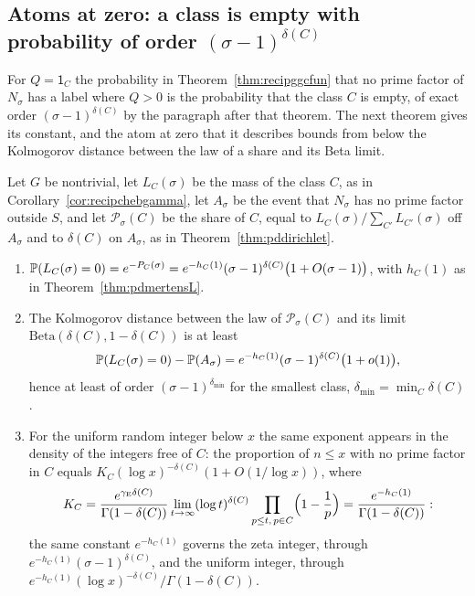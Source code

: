 \subsection{Atoms at zero: a class is empty with probability of order \texorpdfstring{$(\sigma-1)^{\delta(C)}$}{(sigma-1) to the delta(C)}}

For $Q=\mathsf1_C$ the probability in Theorem~\ref{thm:recipggcfun} that no prime factor of $N_\sigma$ has a label where $Q>0$ is the probability that the class $C$ is empty, of exact order $(\sigma-1)^{\delta(C)}$ by the paragraph after that theorem. The next theorem gives its constant, and the atom at zero that it describes bounds from below the Kolmogorov distance between the law of a share and its Beta limit.

\begin{theorem}\label{thm:pdrate}
Let $G$ be nontrivial, let $L_C(\sigma)$ be the mass of the class $C$, as in Corollary~\ref{cor:recipchebgamma}, let $A_\sigma$ be the event that $N_\sigma$ has no prime factor outside $S$, and let $\mathcal P_\sigma(C)$ be the share of $C$, equal to $L_C(\sigma)/\sum_{C'}L_{C'}(\sigma)$ off $A_\sigma$ and to $\delta(C)$ on $A_\sigma$, as in Theorem~\ref{thm:pddirichlet}.
\begin{enumerate}
\item[(i)] $\mathbb{P}(L_C(\sigma)=0)=e^{-P_C(\sigma)}=e^{-h_C(1)}(\sigma-1)^{\delta(C)}\bigl(1+O(\sigma-1)\bigr)$, with $h_C(1)$ as in Theorem~\ref{thm:pdmertensL}.
\item[(ii)] The Kolmogorov distance between the law of $\mathcal P_\sigma(C)$ and its limit $\mathrm{Beta}(\delta(C),1-\delta(C))$ is at least
\[
\mathbb{P}(L_C(\sigma)=0)-\mathbb{P}(A_\sigma)=e^{-h_C(1)}(\sigma-1)^{\delta(C)}\bigl(1+o(1)\bigr),
\]
hence at least of order $(\sigma-1)^{\delta_{\min}}$ for the smallest class, $\delta_{\min}=\min_C\delta(C)$.
\item[(iii)] For the uniform random integer below $x$ the same exponent appears in the density of the integers free of $C$: the proportion of $n\le x$ with no prime factor in $C$ equals $K_C(\log x)^{-\delta(C)}(1+O(1/\log x))$, where
\[
K_C=\frac{e^{\gamma_{\mathrm E}\delta(C)}}{\Gamma(1-\delta(C))}\lim_{t\to\infty}(\log t)^{\delta(C)}\prod_{p\le t,\,p\in C}\Bigl(1-\frac1p\Bigr)=\frac{e^{-h_C(1)}}{\Gamma(1-\delta(C))}:
\]
the same constant $e^{-h_C(1)}$ governs the zeta integer, through $e^{-h_C(1)}(\sigma-1)^{\delta(C)}$, and the uniform integer, through $e^{-h_C(1)}(\log x)^{-\delta(C)}/\Gamma(1-\delta(C))$.
\end{enumerate}
\end{theorem}

